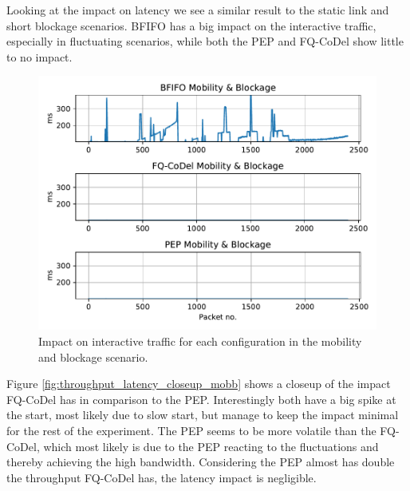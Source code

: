 \documentclass[a4paper,english, 11pt]{report}
\begin{document}
Looking at the impact on latency we see a similar result to the static link and short blockage scenarios. BFIFO has a big impact on the interactive traffic, especially in fluctuating scenarios, while both the PEP and FQ-CoDel show little to no impact.\\

\begin{figure}[!h!] %
	\centering
	\includegraphics[scale=0.70]{../diagrams/witestlab/throughput/latency_mobb.pdf}
  	\caption{Impact on interactive traffic for each configuration in the mobility and blockage scenario.}
  	\label{fig:latency_mobb}
\end{figure}

Figure \ref{fig:throughput_latency_closeup_mobb} shows a closeup of the impact FQ-CoDel has in comparison to the PEP. Interestingly both have a big spike at the start, most likely due to slow start, but manage to keep the impact minimal for the rest of the experiment. The PEP seems to be more volatile than the FQ-CoDel, which most likely is due to the PEP reacting to the fluctuations and thereby achieving the high bandwidth. Considering the PEP almost has double the throughput FQ-CoDel has, the latency impact is negligible.\\
\end{document}
